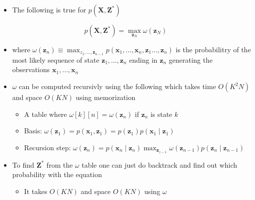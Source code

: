 \documentclass[11pt]{article}
\begin{document}
\begin{itemize}
\item The following is true for \(p(\pmb X, \pmb Z^*)\)
\end{itemize}
\begin{equation}
	p(\pmb X, \pmb Z^*) = \max_{\pmb z_N} \omega (\pmb z_N)
\end{equation}
\begin{itemize}
\item where \(\omega (\pmb z_n) \equiv \max_{z_1, \dots, \pmb z_{n-1}} p(\pmb x_1, \dots, \pmb x_n, \pmb z_1 \dots, \pmb z_n)\) is the probabilitry of the most likely sequence of state \(\pmb z_1, \dots, \pmb z_n\) ending in \(\pmb z_n\) generating the observations \(\pmb x_1, \dots, \pmb x_n\)

\item \(\omega\) can be computed recursivly using the following which takes time \(O(K^2N)\) and space \(O(KN)\) using memorization
\begin{itemize}
\item A table where \(\omega[k][n] = \omega(\pmb z_n)\) if \(\pmb z_n\) is state \(k\)
\item Basis: \(\omega (\pmb z_1) = p(\pmb x_1, \pmb z_1) = p(\pmb z_1) p(\pmb x_1 \mid \pmb z_1)\)
\item Recursion step: \(\omega (\pmb z_n) = p(\pmb x_n \mid \pmb z_n) \max_{\pmb z_{z-1}} \omega (\pmb z_{n-1}) p(\pmb z_n \mid \pmb z_{n-1})\)
\end{itemize}

\item To find \(\pmb Z^*\) from the \(\omega\) table one can just do backtrack and find out which probability with the equation
\begin{itemize}
\item It takes \(O(KN)\) and space \(O(KN)\) using \(\omega\)
\end{itemize}
\end{itemize}
\end{document}
